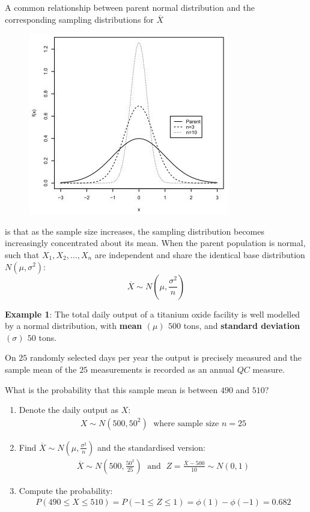 \documentclass[10pt,a4paper]{article}
\begin{document}
A common relationship between parent normal distribution and the corresponding sampling
distributions for $\overline{X}$ \par
\begin{figure} [h!]
    \centering
    \includegraphics[scale=0.7]{parent vs sampling.JPG}
\end{figure}
is that as the sample size increases, the sampling distribution becomes increasingly concentrated
about its mean. When the parent population is normal, such that $X_1, X_2,\dots, X_n$ are
independent and share the identical base distribution $N(\mu, \sigma^2)$:
$$
    \overline{X} \sim N\left(\mu, \frac{\sigma^2}{n}\right) 
$$

\textbf{Example 1}: The total daily output of a titanium oxide facility is well modelled by a normal
distribution, with \textbf{mean $(\mu)$ $500$} tons, and \textbf{standard deviation $(\sigma)$ $50$}
tons. 

On $25$ randomly selected days per year the output is precisely measured and the sample mean
of the $25$ measurements is recorded as an annual $QC$ measure.

What is the probability that this sample mean is between $490$ and $510$?
\begin{enumerate}
    \item Denote the daily output as $X$:
    \begin{align*}
        X \sim N(500, 50^2) \; \text{ where sample size } n = 25
    \end{align*}
    \item Find $\overline{X} \sim N\left(\mu, \frac{\sigma^2}{n}\right)$ and the standardised version:
    \begin{align*}
        \overline{X} \sim N\left(500, \frac{50^2}{25}\right) \; \text{ and } \; Z = \frac{\overline{X}-500}{10} \sim N(0,1)
    \end{align*}
    \item Compute the probability:
    \begin{align*}
        P(490 \leq X \leq 510) = P(-1 \leq Z \leq 1) = \phi(1) - \phi(-1) = 0.682
    \end{align*}
\end{enumerate}
\end{document}
